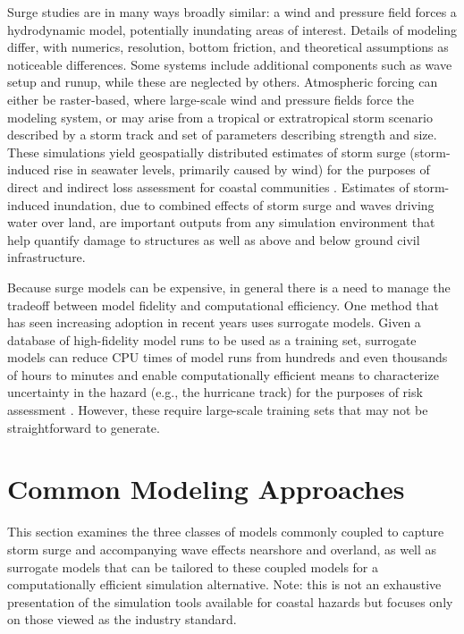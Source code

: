 Surge studies are in many ways broadly similar: a wind and pressure field forces a hydrodynamic model, potentially inundating areas of interest. Details of modeling differ, with numerics, resolution, bottom friction, and theoretical assumptions as noticeable differences. Some systems include additional components such as wave setup and runup, while these are neglected by others. Atmospheric forcing can either be raster-based, where large-scale wind and pressure fields force the modeling system, or may arise from a tropical or extratropical storm scenario described by a storm track and set of parameters describing strength and size. These simulations yield geospatially distributed estimates of storm surge (storm-induced rise in seawater levels, primarily caused by wind) for the purposes of direct and indirect loss assessment for coastal communities \citep{jacob2011responding}. Estimates of storm-induced inundation, due to combined effects of storm surge and waves driving water over land, are important outputs from any simulation environment that help quantify damage to structures as well as above and below ground civil infrastructure.

Because surge models can be expensive, in general there is a need to manage the tradeoff between model fidelity and computational efficiency. One method that has seen increasing adoption in recent years uses surrogate models. Given a database of high-fidelity model runs to be used as a training set, surrogate models can reduce CPU times of model runs from hundreds and even thousands of hours to minutes and enable computationally efficient means to characterize uncertainty in the hazard (e.g., the hurricane track) for the purposes of risk assessment \citep{kijewski-correaCyberEye2014}. However, these require large-scale training sets that may not be straightforward to generate. 

\section{Common Modeling Approaches}
\label{sec:storm_surge_methods}

This section examines the three classes of models commonly coupled to capture storm surge and accompanying wave effects nearshore and overland, as well as surrogate models that can be tailored to these coupled models for a computationally efficient simulation alternative. Note: this is not an exhaustive presentation of the simulation tools available for coastal hazards but focuses only on those viewed as the industry standard. 

